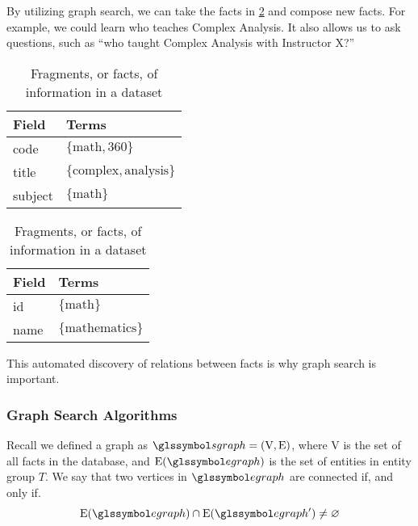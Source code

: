 			\begin{ex}
				By utilizing graph search, we can take the facts in \cref{tbl:facts} and compose new facts.  For example, we could learn who teaches Complex Analysis.  It also allows us to ask questions, such as ``who taught Complex Analysis with Instructor X?''
				
				\begin{table}
					\begin{subtable}[b]{0.5\linewidth}
						\centering
						
						\begin{tabular}{ll}
							\toprule
							Field & Terms \\
							\midrule
							code & \(\{\text{math}, \text{360}\}\) \\
							title & \(\{\text{complex}, \text{analysis}\}\) \\
							subject & \(\{\text{math}\}\) \\
							\bottomrule
						\end{tabular}
						
						\caption{Fact representing a Course}
						\label{subtbl:fact-course}
					\end{subtable}
					\begin{subtable}[b]{0.5\linewidth}
						\centering
						
						\begin{tabular}{ll}
							\toprule
							Field & Terms \\
							\midrule
							id & \(\{\text{math}\}\) \\
							name & \(\{\text{mathematics}\}\) \\
							\bottomrule
						\end{tabular}
						
						\caption{Fact representing a Subject}
						\label{subtbl:fact-subject}
					\end{subtable}
					
					\caption{Fragments, or facts, of information in a dataset}
					\label{tbl:facts}
				\end{table}
			\end{ex}
			
			This automated discovery of relations between facts is why graph search is important.
		
		\subsubsection{Graph Search Algorithms}
			Recall we defined a graph as \(\sgraph{} = (\text{V}, \text{E})\), where \(\text{V}\) is the set of all facts in the database, and \(\text{E}(\egraph{})\) is the set of entities in entity group \(T\).  We say that two vertices in \(\egraph{}\) are connected if, and only if.
			\[
				\text{E}(\egraph{}) \cap \text{E}(\egraph{}') \not= \emptyset
			\]
			
